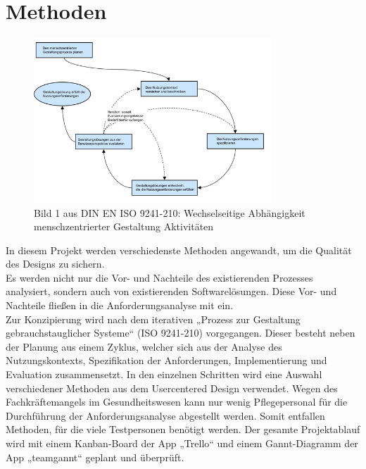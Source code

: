 \documentclass[a4paper, ngerman, 12pt]{scrartcl}
\begin{document}
\section{Methoden}
\begin{figure}[h]
	\centering
	\includegraphics[width=0.8\textwidth]{Bilder/9241-210.png}
	\caption{Bild 1 aus DIN EN ISO 9241-210: Wechselseitige Abhängigkeit menschzentrierter Gestaltung Aktivitäten}
	\label{img:9241-210}
\end{figure}
In diesem Projekt werden verschiedenste Methoden angewandt, um die Qualität des Designs zu sichern.\\

Es werden nicht nur die Vor- und Nachteile des existierenden Prozesses analysiert, sondern auch von existierenden Softwarelösungen. Diese Vor- und Nachteile fließen in die Anforderungsanalyse mit ein.\\

Zur Konzipierung wird nach dem iterativen „Prozess zur Gestaltung gebrauchstauglicher Systeme“ (ISO 9241-210) vorgegangen. Dieser besteht neben der Planung aus einem Zyklus, welcher sich aus der Analyse des Nutzungskontexts, Spezifikation der Anforderungen, Implementierung und Evaluation zusammensetzt. In den einzelnen Schritten wird eine Auswahl verschiedener Methoden aus dem Usercentered Design verwendet. Wegen des Fachkräftemangels im Gesundheitswesen kann nur wenig Pflegepersonal für die Durchführung der Anforderungsanalyse abgestellt werden. Somit entfallen Methoden, für die viele Testpersonen benötigt werden. Der gesamte Projektablauf wird mit einem Kanban-Board der App „Trello“ und einem Gannt-Diagramm der App „teamgannt“ geplant und überprüft.\\

\begin{minipage}{\textwidth}
	\centering
		
		\label{img:projektplan1}
\end{minipage}\\[0.5em]
\end{document}
